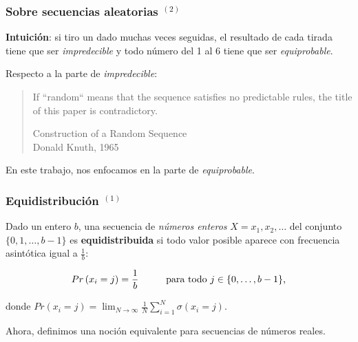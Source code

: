 \documentclass[t, 10pt, mathserif]{beamer}
\begin{document}

\begin{frame}
  \frametitle{Sobre secuencias aleatorias {$^{(2)}$}}

  \textbf{Intuición}: si tiro un dado muchas veces seguidas, el resultado de cada tirada tiene que ser \textit{impredecible} y todo número del 1 al 6 tiene que ser \textit{equiprobable}.
  \pause

  Respecto a la parte de \textit{impredecible}:
  \begin{quote}
    If ``random`` means that the sequence satisfies no predictable rules, the title of this paper is contradictory.
    \begin{flushright}
      \small{Construction of a Random Sequence \\}
      \small{Donald Knuth, 1965}
    \end{flushright}
  \end{quote}
  \pause

  En este trabajo, nos enfocamos en la parte de \textit{equiprobable}.
\end{frame}


\begin{frame}
  \frametitle{Equidistribución {$^{(1)}$}}

  \begin{definition}
    Dado un entero $b$, una secuencia de \textit{números enteros} $X = x_1, x_2, \dots$ del conjunto $\{ 0, 1, \dots, b - 1 \}$ es \textbf{equidistribuida} si todo valor posible aparece con frecuencia asintótica igual a $\frac{1}{b}$:
    \pause

    \begin{equation*}
      \begin{aligned}
        Pr \left( x_i = j \right) = \frac{1}{b} \hspace*{1cm} \text{para todo } j \in \{ 0, \dots, b - 1 \} \text{,}
      \end{aligned}
    \end{equation*}
    \pause

    donde $Pr(x_i = j) = \lim_{N \to \infty} \frac{1}{N} \sum_{i = 1}^{N} \sigma(x_i = j)$.
  \end{definition}
  \pause

  Ahora, definimos una noción equivalente para secuencias de números reales.
\end{frame}
\end{document}
